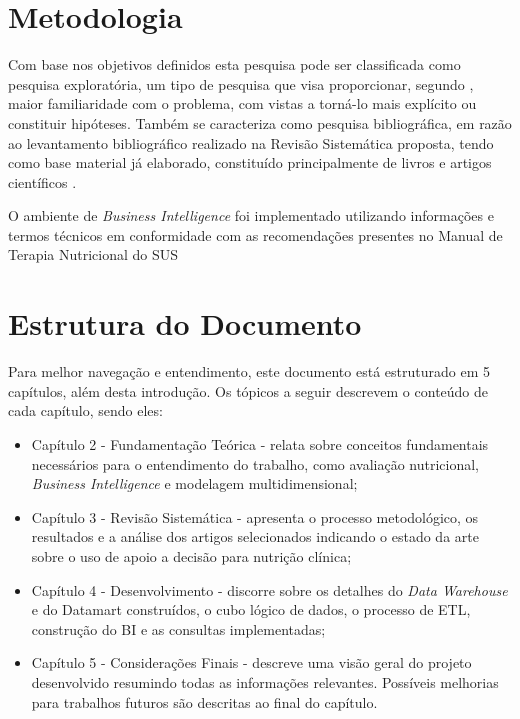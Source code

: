 \section{Metodologia}\label{sec-divisoes}
Com base nos objetivos definidos esta pesquisa pode ser classificada como pesquisa exploratória, um tipo de pesquisa que visa proporcionar, segundo , maior familiaridade com o problema, com vistas a torná-lo mais explícito ou constituir hipóteses.
Também se caracteriza como pesquisa bibliográfica, em razão ao levantamento bibliográfico realizado na Revisão Sistemática proposta, tendo como base material já elaborado, constituído principalmente de livros e artigos científicos \cite{gil2002}.

O ambiente de \textit{Business Intelligence} foi implementado utilizando informações e termos técnicos em conformidade com as recomendações presentes no Manual de Terapia Nutricional do SUS \cite{manualnutricao2016}

\section{Estrutura do Documento}\label{sec-divisoes}
Para melhor navegação e entendimento, este documento está estruturado em 5 capítulos, além desta introdução. Os tópicos a seguir descrevem o conteúdo de cada capítulo, sendo eles:
\begin{itemize}
 \item Capítulo 2 - Fundamentação Teórica - relata sobre conceitos fundamentais necessários para o entendimento do trabalho, como avaliação nutricional, \textit{Business Intelligence} e modelagem multidimensional;

 \item Capítulo 3 - Revisão Sistemática - apresenta o processo metodológico, os resultados e a análise dos artigos selecionados indicando o estado da arte sobre o uso de apoio a decisão para nutrição clínica;

 \item Capítulo 4 - Desenvolvimento - discorre sobre os detalhes do \textit{Data Warehouse} e do Datamart construídos, o cubo lógico de dados, o processo de ETL, construção do BI e as consultas implementadas;
 
 \item Capítulo 5 - Considerações Finais - descreve uma visão geral do projeto desenvolvido resumindo todas as informações relevantes. Possíveis melhorias para trabalhos futuros são descritas ao final do capítulo.
\end{itemize}